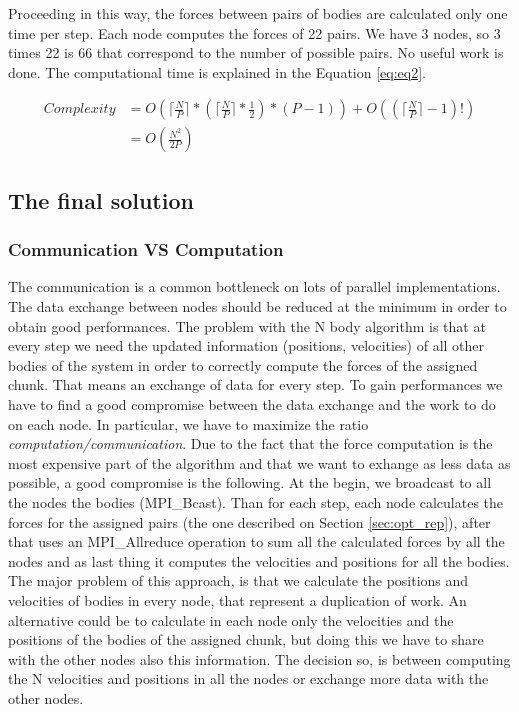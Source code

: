 \documentclass[a4paper]{article}
\begin{document}
Proceeding in this way, the forces between pairs of bodies are calculated only one time per step. Each node computes the forces of 22 pairs. We have 3 nodes, so 3 times 22 is 66 that correspond to the number of possible pairs. No useful work is done. The computational time is explained in the Equation \ref{eq:eq2}.

\begin{equation} \label{eq:eq2}
\begin{split}
Complexity & = O(\lceil\frac{N}{P}\rceil * (\lceil\frac{N}{P}\rceil * \frac{1}{2}) * (P-1)) + O((\lceil\frac{N}{P}\rceil-1)!)\\
 & = O(\frac{N^2}{2P})
\end{split}
\end{equation}

\subsection{The final solution}
\label{sec:comm_comp}

\subsubsection{Communication VS Computation}
\label{sec:comm_comp}
The communication is a common bottleneck on lots of parallel implementations. The data exchange between nodes should be reduced at the minimum in order to obtain good performances. The problem with the N body algorithm is that at every step we need the updated information (positions, velocities) of all other bodies of the system in order to correctly compute the forces of the assigned chunk. That means an exchange of data for every step. To gain performances we have to find a good compromise between the data exchange and the work to do on each node. In particular, we have to maximize the ratio \textit{computation/communication}. Due to the fact that the force computation is the most expensive part of the algorithm and that we want to exhange as less data as possible, a good compromise is the following. At the begin, we broadcast to all the nodes the bodies (MPI_Bcast). Than for each step, each node calculates the forces for the assigned pairs (the one described on Section \ref{sec:opt_rep}), after that uses an MPI_Allreduce operation to sum all the calculated forces by all the nodes and as last thing it computes the velocities and positions for all the bodies. The major problem of this approach, is that we calculate the positions and velocities of bodies in every node, that represent a duplication of work. An alternative could be to calculate in each node only the velocities and the positions of the bodies of the assigned chunk, but doing this we have to share with the other nodes also this information. The decision so, is between computing the N velocities and positions in all the nodes or exchange more data with the other nodes. 
\end{document}
